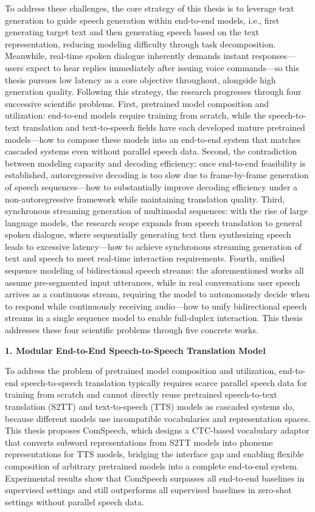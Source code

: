 To address these challenges, the core strategy of this thesis is to leverage text generation to guide speech generation within end-to-end models, i.e., first generating target text and then generating speech based on the text representation, reducing modeling difficulty through task decomposition. Meanwhile, real-time spoken dialogue inherently demands instant responses---users expect to hear replies immediately after issuing voice commands---so this thesis pursues low latency as a core objective throughout, alongside high generation quality. Following this strategy, the research progresses through four successive scientific problems. First, pretrained model composition and utilization: end-to-end models require training from scratch, while the speech-to-text translation and text-to-speech fields have each developed mature pretrained models---how to compose these models into an end-to-end system that matches cascaded systems even without parallel speech data. Second, the contradiction between modeling capacity and decoding efficiency: once end-to-end feasibility is established, autoregressive decoding is too slow due to frame-by-frame generation of speech sequences---how to substantially improve decoding efficiency under a non-autoregressive framework while maintaining translation quality. Third, synchronous streaming generation of multimodal sequences: with the rise of large language models, the research scope expands from speech translation to general spoken dialogue, where sequentially generating text then synthesizing speech leads to excessive latency---how to achieve synchronous streaming generation of text and speech to meet real-time interaction requirements. Fourth, unified sequence modeling of bidirectional speech streams: the aforementioned works all assume pre-segmented input utterances, while in real conversations user speech arrives as a continuous stream, requiring the model to autonomously decide when to respond while continuously receiving audio---how to unify bidirectional speech streams in a single sequence model to enable full-duplex interaction. This thesis addresses these four scientific problems through five concrete works.

\textbf{1. Modular End-to-End Speech-to-Speech Translation Model}

To address the problem of pretrained model composition and utilization, end-to-end speech-to-speech translation typically requires scarce parallel speech data for training from scratch and cannot directly reuse pretrained speech-to-text translation (S2TT) and text-to-speech (TTS) models as cascaded systems do, because different models use incompatible vocabularies and representation spaces. This thesis proposes ComSpeech, which designs a CTC-based vocabulary adaptor that converts subword representations from S2TT models into phoneme representations for TTS models, bridging the interface gap and enabling flexible composition of arbitrary pretrained models into a complete end-to-end system. Experimental results show that ComSpeech surpasses all end-to-end baselines in supervised settings and still outperforms all supervised baselines in zero-shot settings without parallel speech data.

